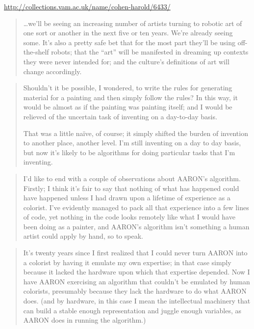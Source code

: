 \documentclass[11pt]{thesis} %
\begin{document}
\url{http://collections.vam.ac.uk/name/cohen-harold/6433/}

\begin{quotation}
  \ldots we'll be seeing an increasing number of artists turning to robotic art of one sort or another in the next five or ten years. We're already seeing some. It's also a pretty safe bet that for the most part they'll be using off-the-shelf robots; that the ``art'' will be manifested in dreaming up contexts they were never intended for; and the culture's definitions of art will change accordingly.
\end{quotation}

\begin{quotation}
  Shouldn't it be possible, I wondered, to write the rules for generating material for a painting and then simply follow the rules?  In this way, it would be almost as if the painting was painting itself; and I would be relieved of the uncertain task of inventing on a day-to-day basis. 

  That was a little naïve, of course; it simply shifted the burden of invention to another place, another level. I'm still inventing on a day to day basis, but now it's likely to be algorithms for doing particular tasks that I'm inventing.
\end{quotation}

\begin{quotation}
  I'd like to end with a couple of observations about AARON's algorithm. Firstly; I think it's fair to say that nothing of what has happened could have happened unless I had drawn upon a lifetime of experience as a colorist.  I've evidently managed to pack all that experience into a few lines of code,  yet nothing in the code looks remotely like what I would have been doing as a painter, and AARON's algorithm isn't something a human artist could apply by hand, so to speak.
\end{quotation}

\begin{quotation}
  It's twenty years since I first realized that I could never turn AARON into a colorist by having it emulate my own expertise; in that case simply because it lacked the hardware upon which that expertise depended. Now I have AARON exercising an algorithm that couldn't be emulated by human colorists, presumably because they lack the hardware to do what AARON does. (and by hardware, in this case I mean the intellectual machinery that can build a stable enough representation and juggle enough variables, as AARON does in running the algorithm.) 
\end{quotation}
\end{document}
